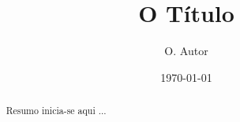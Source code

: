 \documentclass{article}
\title{O Título}
\author{O. Autor}
\date{\today}
\begin{document}
\maketitle

\begin{abstract}
Resumo inicia-se aqui ...
\end{abstract}
            
\end{document}
